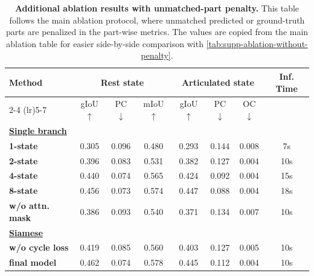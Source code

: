 \begin{table}[!htbp]
    \centering
    \caption{\textbf{Additional ablation results with unmatched-part penalty.}
    This table follows the main ablation protocol, where unmatched predicted or ground-truth parts are penalized in the part-wise metrics.
    The values are copied from the main ablation table for easier side-by-side comparison with \cref{tab:supp-ablation-without-penalty}.}
    \label{tab:supp-ablation-with-penalty}
    \renewcommand{\arraystretch}{1.2}

    \begin{tabular*}{\linewidth}{@{\extracolsep{\fill}} l ccc ccc c @{}}
        \toprule
        \multirow{2}{*}{\textbf{Method}}
        & \multicolumn{3}{c}{\textbf{Rest state}}
        & \multicolumn{3}{c}{\textbf{Articulated state}}
        & \multirow{2}{*}{\textbf{Inf. Time}} \\
        \cmidrule(lr){2-4} \cmidrule(lr){5-7}
        & gIoU$\uparrow$ & PC$\downarrow$ & mIoU$\uparrow$
        & gIoU$\uparrow$ & PC$\downarrow$ & OC$\downarrow$
        & \\
        \midrule

        \multicolumn{8}{l}{\underline{\textbf{Single branch}}} \\
        \textbf{1-state}
        & {0.305} & {0.096} & {0.480} & {0.293} & {0.144} & {0.008} & {7s} \\

        \textbf{2-state}
        & {0.396} & {0.083} & {0.531} & {0.382} & {0.127} & {0.004} & {10s} \\

        \textbf{4-state}
        & {0.440} & {0.074} & {0.565} & {0.424} & {0.092} & {0.004} & {15s} \\

        \textbf{8-state}     
        & {0.456} & {0.073} & {0.574} & {0.447} & {0.088} & {0.004} & {18s} \\
        \textbf{w/o attn. mask}
        & {0.386} & {0.093} & {0.540} & {0.371} & {0.134} & {0.007} & {10s} \\ 

        \midrule
        \multicolumn{8}{l}{\underline{\textbf{Siamese}}} \\

        \textbf{w/o cycle loss}
        & {0.419} & {0.085} & {0.560} & {0.403} & {0.127} & {0.005} & {10s} \\

        \textbf{final model}
        & {0.462} & {0.074} & {0.578} & {0.445} & {0.112} & {0.004} & {10s} \\

        \bottomrule
    \end{tabular*}
\end{table}
